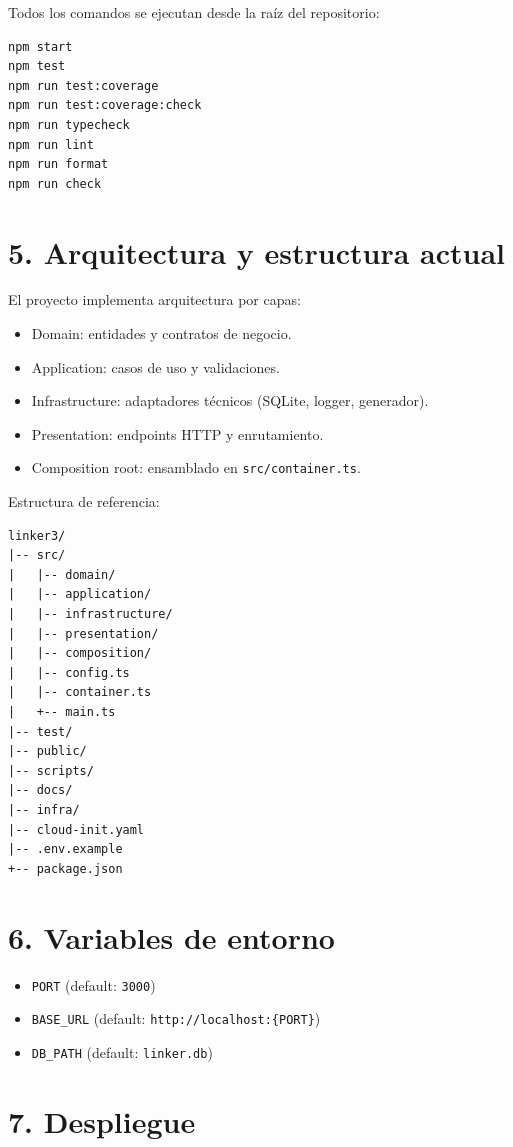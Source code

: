 \documentclass[12pt]{article}
\begin{document}
Todos los comandos se ejecutan desde la raíz del repositorio:

\begin{lstlisting}
npm start
npm test
npm run test:coverage
npm run test:coverage:check
npm run typecheck
npm run lint
npm run format
npm run check
\end{lstlisting}

\section{5. Arquitectura y estructura actual}

El proyecto implementa arquitectura por capas:

\begin{itemize}
  \item Domain: entidades y contratos de negocio.
  \item Application: casos de uso y validaciones.
  \item Infrastructure: adaptadores técnicos (SQLite, logger, generador).
  \item Presentation: endpoints HTTP y enrutamiento.
  \item Composition root: ensamblado en \texttt{src/container.ts}.
\end{itemize}

Estructura de referencia:

\begin{lstlisting}
linker3/
|-- src/
|   |-- domain/
|   |-- application/
|   |-- infrastructure/
|   |-- presentation/
|   |-- composition/
|   |-- config.ts
|   |-- container.ts
|   +-- main.ts
|-- test/
|-- public/
|-- scripts/
|-- docs/
|-- infra/
|-- cloud-init.yaml
|-- .env.example
+-- package.json
\end{lstlisting}

\section{6. Variables de entorno}

\begin{itemize}
  \item \texttt{PORT} (default: \texttt{3000})
  \item \texttt{BASE\_URL} (default: \texttt{http://localhost:\{PORT\}})
  \item \texttt{DB\_PATH} (default: \texttt{linker.db})
\end{itemize}

\section{7. Despliegue}
\end{document}
